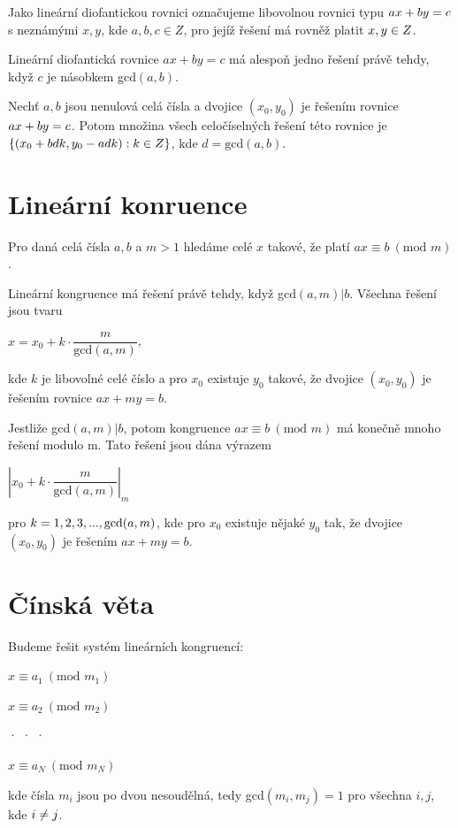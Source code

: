 \documentclass{szzclass}
\begin{document}
Jako lineární diofantickou rovnici označujeme libovolnou rovnici typu $ax +\nolinebreak by = c$
s neznámými $x, y$, kde $a, b, c \in Z$, pro jejíž řešení má rovněž platit $x, y \in\nolinebreak Z$.

Lineární diofantická rovnice $ax + by = c$ má alespoň jedno řešení právě
tehdy, když $c$ je násobkem gcd$(a, b)$.

Nechť $a, b$ jsou nenulová celá čísla a dvojice $(x_0, y_0)$ je řešením rovnice
$ax +\nolinebreak by =\nolinebreak c$. Potom množina všech celočíselných řešení této rovnice je
$\{(x_0 +bdk, y_0 -adk) :\nolinebreak k \in\nolinebreak Z\}$, kde $d = \text{gcd}(a, b)$.


\section{Lineární konruence}
Pro daná celá čísla $a, b$ a $m > 1$ hledáme
celé $x$ takové, že platí $ax \equiv b~(\text{mod } m)$.

Lineární kongruence má řešení právě tehdy, když gcd$(a, m)|b$. Všechna
řešení jsou tvaru 
\begin{center}
$x = x_0 + k ·\dfrac{m}{\text{gcd}(a, m)}$,
\end{center}
kde $k$ je libovolné celé číslo a pro $x_0$ existuje $y_0$ takové, že dvojice $(x_0, y_0)$
je řešením rovnice $ax + my = b$.


Jestliže gcd$(a, m)|b$, potom kongruence $ax \equiv b~(\text{mod } m)$ má konečně
mnoho řešení modulo m. Tato řešení jsou dána výrazem
\begin{center}
$|x_0 + k ·\dfrac{m}{\text{gcd}(a, m)}|_m$
\end{center}
pro $k =\nolinebreak 1, 2, 3, . . . , \text{gcd}(a, m)$, kde pro $x_0$ existuje nějaké $y_0$ tak, že dvojice
$(x_0, y_0)$ je řešením $ax + my = b$.

\newpage

\section{Čínská věta}

Budeme řešit systém lineárních kongruencí:
\begin{center}
$x \equiv a_1~(\text{mod } m_1)$

$x \equiv a_2~(\text{mod } m_2)$

· · ·

$x \equiv a_N~(\text{mod } m_N )$

\end{center}
kde čísla $m_i$ jsou po dvou nesoudělná, tedy gcd$(m_i, m_j ) = 1$ pro všechna $i, j$, kde $i \neq\nolinebreak j$.
\end{document}
